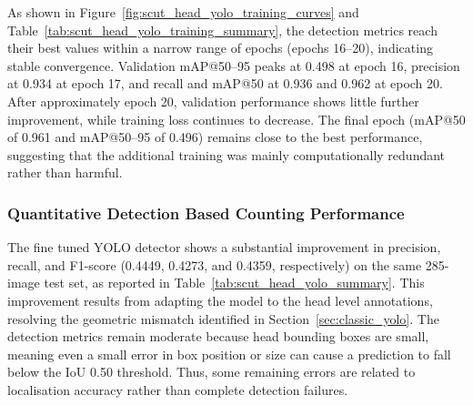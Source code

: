 As shown in Figure~\ref{fig:scut_head_yolo_training_curves} and Table~\ref{tab:scut_head_yolo_training_summary}, the detection metrics reach their best values within a narrow range of epochs (epochs 16--20), indicating stable convergence. Validation mAP@50--95 peaks at 0.498 at epoch 16, precision at 0.934 at epoch 17, and recall and mAP@50 at 0.936 and 0.962 at epoch 20. After approximately epoch 20, validation performance shows little further improvement, while training loss continues to decrease. The final epoch (mAP@50 of 0.961 and mAP@50--95 of 0.496) remains close to the best performance, suggesting that the additional training was mainly computationally redundant rather than harmful.

\subsubsection{Quantitative Detection Based Counting Performance}

The fine tuned YOLO detector shows a substantial improvement in precision, recall, and F1-score (0.4449, 0.4273, and 0.4359, respectively) on the same 285-image test set, as reported in Table~\ref{tab:scut_head_yolo_summary}. This improvement results from adapting the model to the head level annotations, resolving the geometric mismatch identified in Section~\ref{sec:classic_yolo}. The detection metrics remain moderate because head bounding boxes are small, meaning even a small error in box position or size can cause a prediction to fall below the IoU 0.50 threshold. Thus, some remaining errors are related to localisation accuracy rather than complete detection failures.

